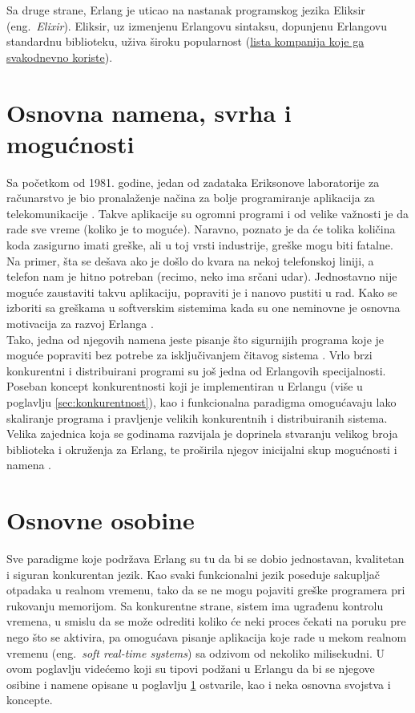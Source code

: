 \documentclass[a4paper]{article}
\begin{document}
Sa druge strane, Erlang je uticao na nastanak programskog jezika Eliksir (eng.~{\em Elixir}). Eliksir,
uz izmenjenu Erlangovu sintaksu, dopunjenu Erlangovu standardnu biblioteku, uživa široku popularnost 
(\href{https://elixir-companies.com/}{lista kompanija koje ga svakodnevno koriste}). 

\section{Osnovna namena, svrha i mogućnosti}
\label{sec:namena}
Sa početkom od 1981. godine, jedan od zadataka Eriksonove laboratorije za računarstvo je bio pronalaženje načina za bolje programiranje aplikacija
za telekomunikacije \cite{phdthesis}. Takve aplikacije su ogromni programi i od velike važnosti je da rade sve vreme (koliko je to moguće). 
Naravno, poznato je da će tolika količina koda zasigurno imati greške, ali u toj vrsti industrije, greške mogu biti fatalne. Na primer, 
šta se dešava ako je došlo do kvara na nekoj telefonskoj liniji, a telefon nam je hitno potreban (recimo, neko ima srčani udar).
Jednostavno nije moguće zaustaviti takvu aplikaciju, popraviti je i nanovo pustiti u rad.
Kako se izboriti sa greškama u softverskim sistemima kada su one neminovne je osnovna motivacija za razvoj Erlanga \cite{phdthesis}. \\

Tako, jedna od njegovih namena jeste pisanje što sigurnijih programa koje je moguće popraviti bez potrebe za isključivanjem čitavog sistema \cite{book_joe}.
Vrlo brzi konkurentni i distribuirani programi su još jedna od Erlangovih specijalnosti. 
Poseban koncept konkurentnosti koji je implementiran u Erlangu (više u poglavlju \ref{sec:konkurentnost}), kao i funkcionalna paradigma 
omogućavaju lako skaliranje programa i pravljenje velikih konkurentnih i distribuiranih sistema.
Velika zajednica koja se godinama razvijala je doprinela stvaranju velikog broja biblioteka i okruženja za Erlang, te proširila njegov 
inicijalni skup mogućnosti i namena \cite{book_joe}. 


\section{Osnovne osobine}
\label{sec:osobine}
Sve paradigme koje podržava Erlang su tu da bi se dobio jednostavan, kvalitetan i
siguran konkurentan jezik.
Kao svaki funkcionalni jezik poseduje sakupljač otpadaka \cite{book_concurrent} u realnom vremenu, tako da se ne mogu pojaviti greške programera pri rukovanju memorijom. 
Sa konkurentne strane, sistem ima ugrađenu kontrolu vremena, 
u smislu da se može odrediti koliko će neki proces čekati na poruku pre nego što se aktivira, 
pa omogućava pisanje aplikacija koje rade u mekom realnom vremenu (eng.~{\em soft real-time systems}) \cite{book_concurrent} sa odzivom od nekoliko milisekudni. 
U ovom poglavlju videćemo koji su tipovi podžani u Erlangu da bi se njegove osibine i namene opisane u poglavlju \ref{sec:namena} ostvarile, 
kao i neka osnovna svojstva i koncepte.
\end{document}
